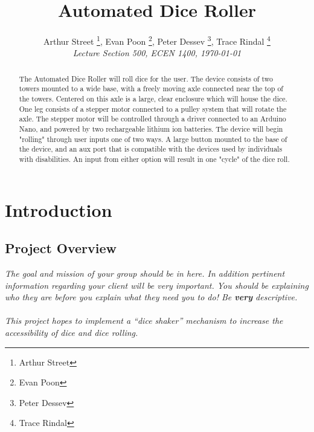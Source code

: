 \documentclass[12pt]{article}
\title{Automated Dice Roller}
\author{
  Arthur Street \footnote{Arthur Street},
  Evan Poon \footnote{Evan Poon},
  Peter Dessev \footnote{Peter Dessev},
  Trace Rindal \footnote{Trace Rindal}\\
    {\normalsize\itshape
   Lecture Section 500, ECEN 1400, \today}\\
 }
\begin{document}
\maketitle

\begin{abstract}
 The Automated Dice Roller will roll dice for the user. The device consists of two towers mounted to a wide base, with a freely moving axle connected near the top of the towers. Centered on this axle is a large, clear enclosure which will house the dice. One leg consists of a stepper motor connected to a pulley system that will rotate the axle. The stepper motor will be controlled through a driver connected to an Arduino Nano, and powered by two rechargeable lithium ion batteries. The device will begin "rolling" through user inputs one of two ways. A large button mounted to the base of the device, and an aux port that is compatible with the devices used by individuals with disabilities. An input from either option will result in one "cycle" of the dice roll.
\end{abstract}

\newpage

\tableofcontents

\newpage

\section{Introduction}

\subsection{Project Overview}
\textit{The goal and mission of your group should be in here. In addition pertinent information regarding your client will be very important. You should be explaining who they are before you explain what they need you to do! Be \textbf{very} descriptive.\\\\
This project hopes to implement a “dice shaker” mechanism to increase the accessibility of dice and dice rolling.}
\end{document}
